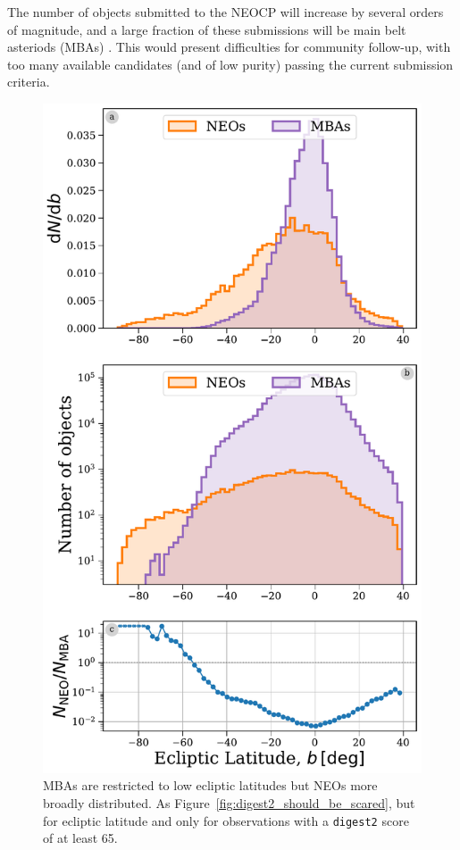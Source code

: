 \documentclass[twocolumn]{aastex631}
\newcommand{\dig}{\texttt{digest2}}
\begin{document}
The number of objects submitted to the NEOCP will increase by several orders of magnitude, and a large fraction of these submissions will be main belt asteriods (MBAs) \citep{sky-is-falling}. This would present difficulties for community follow-up, with too many available candidates (and of low purity) passing the current submission criteria.

\begin{figure}[htb]
    \centering
    \includegraphics[width=\columnwidth]{figures/ecliptic_latitude_dist_highscore.pdf}
    \caption{MBAs are restricted to low ecliptic latitudes but NEOs more broadly distributed. As Figure~\ref{fig:digest2_should_be_scared}, but for ecliptic latitude and only for observations with a \dig{} score of at least 65.}
    \label{fig:ecl_lat_highscore}
\end{figure}
\end{document}
